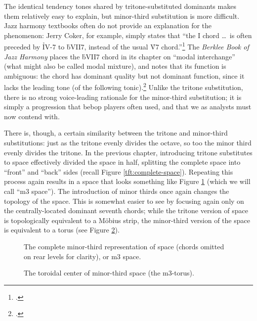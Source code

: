 The identical tendency tones shared by tritone-substituted dominants makes
them relatively easy to explain, but minor-third substitution is more
difficult. Jazz harmony textbooks often do not provide an explanation for the
phenomenon: Jerry Coker, for example, simply states that ``the I chord \ldots\ is often
preceded by \h{IV-7} to \h{bVII7}, instead of the usual \h{V7}
chord.''\footcite[82]{coker:elements} The \emph{Berklee Book of Jazz Harmony}
places the \h{bVII7} chord in its chapter on ``modal interchange'' (what might
also be called modal mixture), and notes that its function is ambiguous:
the chord has dominant quality but not dominant function, since it lacks the
leading tone (of the following tonic).\footcite[123--24]{berklee:harmony} Unlike the tritone
substitution, there is no strong voice-leading rationale for the minor-third
substitution; it is simply a progression that bebop players often used, and
that we as analysts must now contend with.

There is, though, a certain similarity between the tritone and minor-third
substitutions: just as the tritone evenly divides the octave, so too the minor
third evenly divides the tritone. In the previous chapter, introducing tritone
substitutes to \tf space effectively divided the space in half, splitting the
complete space into ``front'' and ``back'' sides (recall Figure
\ref{tft:complete-space}). Repeating this process again results in a space
that looks something like Figure \ref{mts:m3-space} (which we will call ``m3
space''). The introduction of minor thirds once again changes the topology of
the space. This is somewhat easier to see by focusing again only on the
centrally-located dominant seventh chords; while the tritone version of \tf
space is topologically equivalent to a Möbius strip, the minor-third version
of the space is equivalent to a torus (see Figure
\ref{mts:m3-torus}).

\begin{figure}[tbp]
  \caption[The complete minor-third representation of \tf space (m3 space).]{The
    complete minor-third representation of \tf space (\ii chords omitted on
    rear levels for clarity), or m3 space.}
  \label{mts:m3-space}
\end{figure}


\begin{figure}[tbp]
  \caption{The toroidal center of minor-third space (the m3-torus).}
  \label{mts:m3-torus}
\end{figure}


